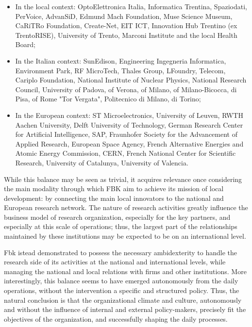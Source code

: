 \begin{itemize}

\item In the local context: OptoElettronica Italia, Informatica Trentina, Spaziodati, PerVoice, AdvanSiD, Edmund Mach Foundation, Muse Science Museum, CaRiTRo Foundation, Create-Net, EIT ICT, Innovation Hub Trentino (ex TrentoRISE), University of Trento, Marconi Institute and the local Health Board;

\item In the Italian context: SunEdison, Engineering Ingegneria Informatica, Environment Park, RF MicroTech, Thales Group, LFoundry, Telecom, Cariplo Foundation, National Institute of Nuclear Physics, National Research Council, University of Padova, of Verona, of Milano, of Milano-Bicocca, di Pisa, of Rome "Tor Vergata", Politecnico di Milano, di Torino;

\item In the European context: ST Microelectronics, University of Leuven, RWTH Aachen University, Delft University of Technology, German Research Center for Artificial Intelligence, SAP, Fraunhofer Society for the Advancement of Applied Research, European Space Agency, French Alternative Energies and Atomic Energy Commission,  CERN, French National Center for Scientific Research, University of Catalunya, University of Valencia.

\end{itemize}

While this balance may be seen as trivial, it acquires relevance once considering the main modality through which FBK aim to achieve its mission of local development: by connecting the main local innovators to the national and European research network. The nature of research activities greatly influence the business model of research organization, especially for the key partners, and especially at this scale of operations; thus, the largest part of the relationships maintained by these institutions may be expected to be on an international level. 

Fbk istead demonstrated to possess the necessary ambidexterity to handle the research side of its activities at the national and international levels, while managing the national and local relations with firms and other institutions. More interestingly, this balance seems to have emerged autonomously from the daily operations, without the intervention a specific and structured policy. Thus, the natural conclusion is that the organizational climate and culture, autonomously and without the influence of internal and external policy-makers, precisely fit the objectives of the organization, and successfully shaping the daily processes.  

